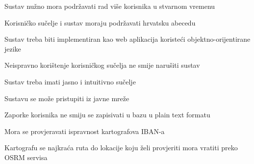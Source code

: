		\begin{packed_item}

			\item Sustav nužno mora podržavati rad više korisnika u stvarnom vremenu
			\item Korisničko sučelje i sustav moraju podržavati hrvatsku abecedu
			\item Sustav treba biti implementiran kao web aplikacija koristeći objektno-orijentirane jezike
			\item Neispravno korištenje korisničkog sučelja ne smije narušiti sustav
			\item Sustav treba imati jasno i intuitivno sučelje
			\item Sustavu se može pristupiti iz javne mreže
			\item Zaporke korisnika ne smiju se zapisivati u bazu u plain text formatu
			\item Mora se provjeravati ispravnost kartografova IBAN-a
			\item Kartografu se najkraća ruta do lokacije koju želi provjeriti mora vratiti preko OSRM servisa

		\end{packed_item}
